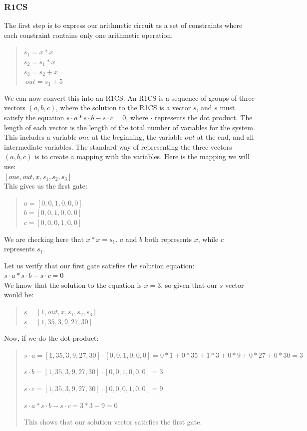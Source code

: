 \subsubsection{R1CS}
\label{subsec:r1cs}
The first step is to express our arithmetic circuit as a set of constraints where each constraint contains only one arithmetic operation.
\begin{quote}
$s_1 = x * x$
\\
$s_2 = s_1 * x$
\\
$s_3 = s_2 + x$
\\
$~out = s_3 + 5$
\end{quote}

We can now convert this into an R1CS.
An R1CS is a sequence of groups of three vectors $(a, b, c)$, where the solution to the R1CS is a vector $s$, and $s$ must satisfy the equation $s \cdot a * s \cdot b - s \cdot c = 0$, where $\cdot$ represents the dot product.
The length of each vector is the length of the total number of variables for the system. This includes a variable $one$ at the beginning, the variable $out$ at the end, and all intermediate variables.
The standard way of representing the three vectors $(a, b, c)$ is to create a mapping with the variables.
Here is the mapping we will use:
\\ 
$[one,out,x,s_1,s_2,s_3]$
\\
This gives us the first gate:
\begin{quote}
   $a = [0,0,1,0,0,0]$
   \\
   $b = [0,0,1,0,0,0]$
   \\
   $c = [0,0,0,1,0,0]$
\end{quote}
We are checking here that $x*x=s_1$.
$a$ and $b$ both represents $x$, while $c$ represents $s_1$.

 Let us verify that our first gate satisfies the solution equation:
   \\
   $s \cdot a * s \cdot b - s \cdot c = 0$
   \\
 We know that the solution to the equation is $ x = 3 $, so given that our $s$ vector
 would be: 
   \begin{quote}
   $s=[1,out,x,s_1,s_2,s_3]$
   \\
   $s=[1,35,3,9,27,30]$
\end{quote}

Now, if we do the dot product:
\begin{quote}
   $s \cdot a =  [1,35,3,9,27,30] \cdot [0,0,1,0,0,0] = 0*1+0*35+1*3+0*9+0*27+0*30= 3$ 

   $s \cdot b = [1,35,3,9,27,30] \cdot [0,0,1,0,0,0] = 3$ 

   $s \cdot c = [1,35,3,9,27,30] \cdot [0,0,0,1,0,0] = 9$ 

   $s \cdot a * s \cdot b - s \cdot c =  3 * 3 - 9 = 0$

This shows that our solution vector satisfies the first gate.
\end{quote}

